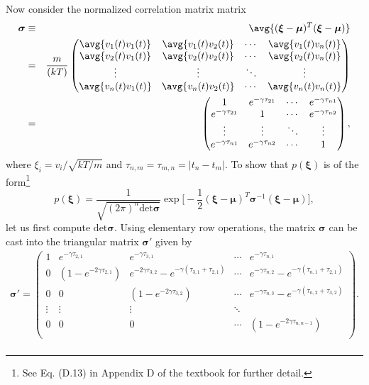 Now consider the normalized correlation matrix matrix
\begin{eqnarray}
\boldsymbol{\sigma} &\equiv& \avg{(\boldsymbol{\xi} - \boldsymbol{\mu})^{T} (\boldsymbol{\xi} - \boldsymbol{\mu})} \\
&=& \frac{m}{(kT)} \begin{pmatrix}
 \avg{v_1(t) v_1(t)} & \avg{v_1(t) v_2(t)} & \cdots & \avg{v_1(t) v_n(t)}  \\
 \avg{v_2(t) v_1(t)} & \avg{v_2(t) v_2(t)}  & \cdots & \avg{v_2(t) v_n(t)}\\
 \vdots & \vdots  & \ddots & \vdots \\
 \avg{v_n(t) v_1(t)} & \avg{v_n(t) v_2(t)}  & \cdots & \avg{v_n(t) v_n(t)}\\
\end{pmatrix} \\
&=& \begin{pmatrix}
 1 & e^{-\gamma	\tau_{21}} & \cdots & e^{-\gamma \tau_{n1}}  \\
e^{-\gamma	\tau_{21}} & 1  & \cdots & e^{-\gamma \tau_{n2}}\\
 \vdots & \vdots  & \ddots & \vdots \\
 e^{-\gamma \tau_{n1}} & e^{-\gamma \tau_{n2}}  & \cdots & 1\\
\end{pmatrix}, \\
\end{eqnarray}
where $\xi_i = v_i /\sqrt{kT/m}$ and $\tau_{n,m} = \tau_{m,n} = |t_n - t_m|$. To show that $p(\boldsymbol{\xi})$ is of the form\footnote{See Eq. (D.13) in Appendix D of the textbook for further detail.}
\begin{equation}
p(\boldsymbol{\xi}) = \frac{1}{\sqrt{(2\pi)^n \text{det} \boldsymbol{\sigma}}} \exp\bigg[-\frac{1}{2} (\boldsymbol{\xi} - \boldsymbol{\mu})^{T} \boldsymbol{\sigma}^{-1} (\boldsymbol{\xi} - \boldsymbol{\mu})\bigg],
\end{equation}
let us first compute $\text{det}\boldsymbol{\sigma}$. Using elementary row operations, the matrix $\boldsymbol{\sigma}$ can be cast into the triangular matrix $\boldsymbol{\sigma}'$ given by
\begin{eqnarray}
\boldsymbol{\sigma}' = \begin{pmatrix}
 1 & e^{-\gamma	\tau_{2,1}} & e^{-\gamma	\tau_{3,1}}& \cdots & e^{-\gamma \tau_{n,1}}  \\
0 & (1 - e^{-2\gamma \tau_{2,1}})  & e^{-2\gamma \tau_{3,2}} -e^{-\gamma (\tau_{3,1}+\tau_{2,1})}  & \cdots & e^{-\gamma \tau_{n,2}} - e^{-\gamma (\tau_{n,1}+\tau_{2,1})} \\
0 & 0  & (1-e^{-2\gamma \tau_{3,2}}) & \cdots & e^{-\gamma \tau_{n,3}} - e^{-\gamma(\tau_{n,2}+ \tau_{3,2})} \\
 \vdots & \vdots  & \vdots & \ddots \\
 0 & 0  & 0 & \cdots & (1-e^{-2\gamma \tau_{n,n-1}})\\
\end{pmatrix}. \\
\end{eqnarray}
